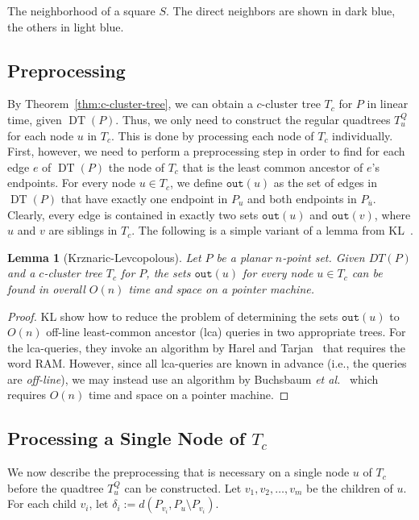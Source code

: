 \documentclass[11pt]{paper}
\newcommand {\etal} {\textit {et al.}}
\newcommand {\eqdef} {:=}
\DeclareMathOperator {\DT}{DT}
\newcommand {\parent} {\overline}
\newtheorem {lem}[theorem] {Lemma}
\begin{document}
 {The neighborhood of a square $S$. The direct neighbors
are shown in dark blue, the others in light blue.}

\subsection{Preprocessing}
\label{sec:dt->c-cluster-preprocess}

By Theorem~\ref{thm:c-cluster-tree}, we can obtain a $c$-cluster
tree $T_c$ for $P$ in linear time, given $\DT(P)$. Thus, we only
need to construct the regular quadtrees $T_u^Q$ for each node 
$u$ in $T_c$. This is done by processing each node of $T_c$
individually. First, however, we need to perform a preprocessing step
in order to find  for each edge $e$ of $\DT(P)$ the node of  $T_c$
that is the least common ancestor of $e$'s endpoints.
For every node $u \in T_c$, we define $\texttt{out}(u)$ as the
set of edges in $\DT(P)$ that have exactly one endpoint in
$P_u$ and both endpoints in $P_{\parent u}$. Clearly, every edge is
contained in exactly two sets $\texttt{out}(u)$ and $\texttt{out}(v)$,
where $u$ and $v$ are siblings in $T_c$.
The following is a simple variant of a lemma from
KL~\cite[Lemma~3]{KrznaricLe98}.

\begin{lem}[Krznaric-Levcopolous]\label{lem:out}
Let $P$ be a planar $n$-point set.
Given $DT(P)$ and a $c$-cluster tree $T_c$ for $P$, the sets
\emph{$\texttt{out}(u)$} for every node $u \in T_c$ can be found in overall
$O(n)$ time and space on a pointer machine.
\end{lem}

\begin{proof}
KL show how to reduce the problem of determining the sets
$\texttt{out}(u)$ to $O(n)$ off-line least-common ancestor (lca) queries 
in two appropriate trees. For the lca-queries,
they invoke an algorithm by Harel and Tarjan~\cite{HarelTa84} that requires
the word RAM. However, since all lca-queries are known in
advance (i.e., the queries are \emph{off-line}), we  
may instead use an algorithm by
Buchsbaum \etal~\cite[Theorem~6.1]{BuchsbaumGeKaRoTaWe08} which 
requires $O(n)$ time and space on a pointer machine.
\end{proof}

\subsection{Processing a Single Node of $T_c$}
\label{sec:one-node}
We now describe the preprocessing that is necessary on a single
node $u$ of $T_c$ before the quadtree $T_u^Q$ can be constructed.
Let $v_1, v_2, \ldots, v_m$
be the children of $u$. For each child $v_i$, let
$\delta_i \eqdef d(P_{v_i}, P_u \setminus P_{v_i})$.
\end{document}
